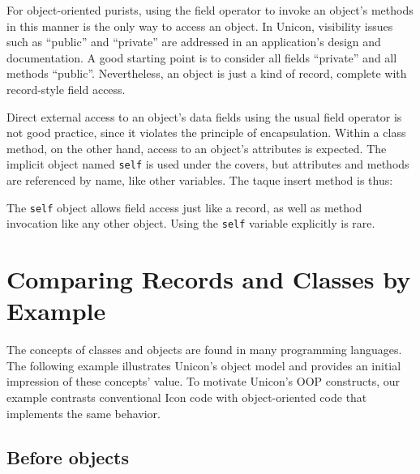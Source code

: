 
For object-oriented purists, using the field operator to invoke an
object's methods in this manner is the only way to
access an object. In Unicon, visibility issues such as
``public'' and ``private'' are addressed in an
application's design and documentation. A good
starting point is to consider all fields
``private'' and all methods ``public''. Nevertheless, an object is just a
kind of record, complete with record-style field access.

Direct external access to an object's data fields using
the usual field operator is not good practice, since it violates the
principle of encapsulation. Within a class method, on the other hand,
access to an object's attributes is expected. The
implicit object named \texttt{self} is used under the covers, but
attributes and methods are referenced by name, like other variables.
The taque insert method is thus: 


The \texttt{self} object allows field access just like a record, as well
as method invocation like any other object. Using the \texttt{self}
variable explicitly is rare.

\section{Comparing Records and Classes by Example}

The concepts of classes and objects are found in many programming
languages. The following example illustrates Unicon's object model
and provides an initial impression of these
concepts' value. To motivate Unicon's OOP
constructs, our example contrasts conventional Icon
code with object-oriented code that implements the same behavior.

\subsection{Before objects}

